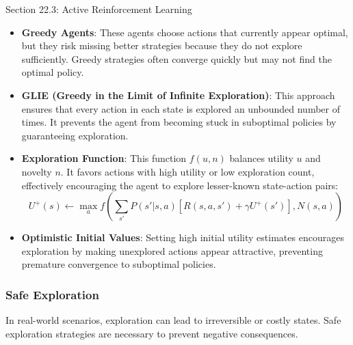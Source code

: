 \begin{notes}{Section 22.3: Active Reinforcement Learning}
\begin{highlight}
        \begin{itemize}
            \item \textbf{Greedy Agents}: These agents choose actions that currently appear optimal, but they risk missing better strategies because they do not explore sufficiently. Greedy strategies often 
            converge quickly but may not find the optimal policy.
            \item \textbf{GLIE (Greedy in the Limit of Infinite Exploration)}: This approach ensures that every action in each state is explored an unbounded number of times. It prevents the agent from 
            becoming stuck in suboptimal policies by guaranteeing exploration.
            \item \textbf{Exploration Function}: This function $f(u, n)$ balances utility $u$ and novelty $n$. It favors actions with high utility or low exploration count, effectively encouraging the 
            agent to explore lesser-known state-action pairs:
            \[
            U^+(s) \leftarrow \max_a f\left(\sum_{s'} P(s' | s, a) [R(s, a, s') + \gamma U^+(s')], N(s, a)\right)
            \]
            \item \textbf{Optimistic Initial Values}: Setting high initial utility estimates encourages exploration by making unexplored actions appear attractive, preventing premature convergence to suboptimal 
            policies.
        \end{itemize}
    
    \end{highlight}
    
    \subsubsection*{Safe Exploration}
    
    In real-world scenarios, exploration can lead to irreversible or costly states. Safe exploration strategies are necessary to prevent negative consequences.
    
    \begin{highlight}
    

\end{highlight}
\end{notes}
